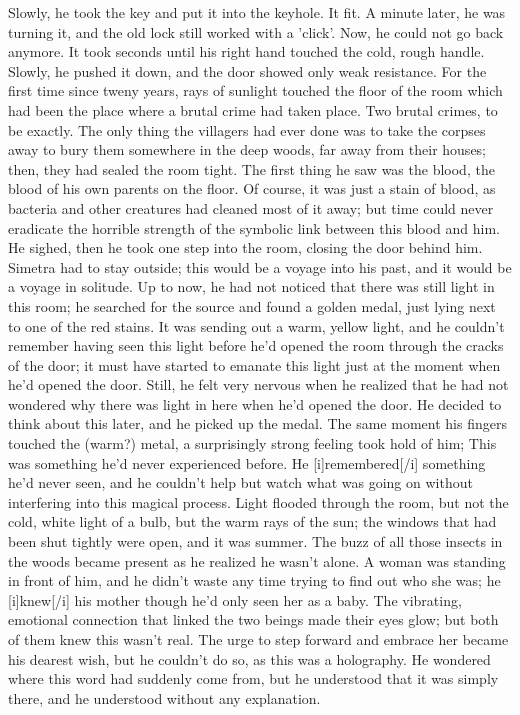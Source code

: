 Slowly, he took the key and put it into the keyhole. 
It fit. 
A minute later, he was turning it, and the old lock still worked with a 'click'. Now, he could not go back anymore. 
It took seconds until his right hand touched the cold, rough handle. Slowly, he pushed it down, and the door showed only weak resistance. 
For the first time since tweny years, rays of sunlight touched the floor of the room which had been the place where a brutal crime had taken place. Two brutal crimes, to be exactly. The only thing the villagers had ever done was to take the corpses away to bury them somewhere in the deep woods, far away from their houses; then, they had sealed the room tight. 
The first thing he saw was the blood, the blood of his own parents on the floor. Of course, it was just a stain of blood, as bacteria and other creatures had cleaned most of it away; but time could never eradicate the horrible strength of the symbolic link between this blood and him. 
He sighed, then he took one step into the room, closing the door behind him. Simetra had to stay outside; this would be a voyage into his past, and it would be a voyage in solitude. 
Up to now, he had not noticed that there was still light in this room; he searched for the source and found a golden medal, just lying next to one of the red stains. It was sending out a warm, yellow light, and he couldn't remember having seen this light before he'd opened the room through the cracks of the door; it must have started to emanate this light just at the moment when he'd opened the door. Still, he felt very nervous when he realized that he had not wondered why there was light in here when he'd opened the door. 
He decided to think about this later, and he picked up the medal. The same moment his fingers touched the (warm?) metal, a surprisingly strong feeling took hold of him; This was something he'd never experienced before. He [i]remembered[/i] something he'd never seen, and he couldn't help but watch what was going on without interfering into this magical process. 
Light flooded through the room, but not the cold, white light of a bulb, but the warm rays of the sun; the windows that had been shut tightly were open, and it was summer. The buzz of all those insects in the woods became present as he realized he wasn't alone. 
A woman was standing in front of him, and he didn't waste any time trying to find out who she was; he [i]knew[/i] his mother though he'd only seen her as a baby. The vibrating, emotional connection that linked the two beings made their eyes glow; but both of them knew this wasn't real. The urge to step forward and embrace her became his dearest wish, but he couldn't do so, as this was a holography. He wondered where this word had suddenly come from, but he understood that it was simply there, and he understood without any explanation. 
